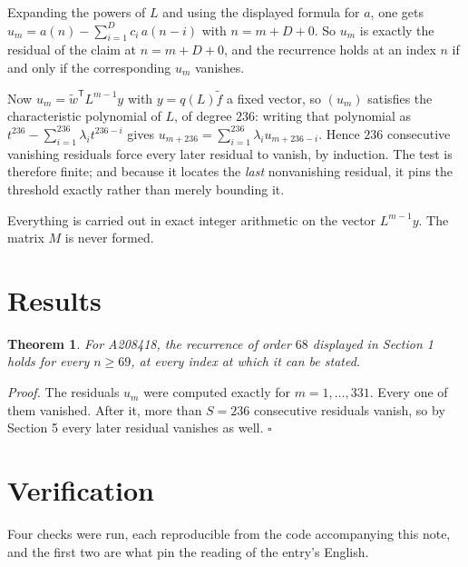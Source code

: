 \documentclass[11pt]{article}
\newtheorem{theorem}{Theorem}
\theoremstyle{definition}
\begin{document}
Expanding the powers of $L$ and using the displayed formula for $a$, one gets $u_m = a(n) - \sum_{i=1}^{D} c_i\,a(n-i)$ with $n = m + D + 0$. So $u_m$ is exactly the residual of the claim at $n = m + D + 0$, and the recurrence holds at an index $n$ if and only if the corresponding $u_m$ vanishes.

Now $u_m = \tilde w^{\mathsf T} L^{m-1} y$ with $y = q(L)\tilde f$ a fixed vector, so $(u_m)$ satisfies the characteristic polynomial of $L$, of degree $236$: writing that polynomial as $t^{236} - \sum_{i=1}^{236} \lambda_i t^{236-i}$ gives $u_{m+236} = \sum_{i=1}^{236} \lambda_i u_{m+236-i}$. Hence $236$ consecutive vanishing residuals force every later residual to vanish, by induction. The test is therefore finite; and because it locates the {\itshape last} nonvanishing residual, it pins the threshold exactly rather than merely bounding it.

Everything is carried out in exact integer arithmetic on the vector $L^{m-1}y$. The matrix $M$ is never formed.

\section{Results}

\begin{theorem} For A208418, the recurrence of order $68$ displayed in Section 1 holds for every $n \ge 69$, at every index at which it can be stated.\end{theorem}

{\itshape Proof.} The residuals $u_m$ were computed exactly for $m = 1,\dots,331$. Every one of them vanished. After it, more than $S = 236$ consecutive residuals vanish, so by Section 5 every later residual vanishes as well. $\square$

\section{Verification}

Four checks were run, each reproducible from the code accompanying this note, and the first two are what pin the reading of the entry's English.
\end{document}
